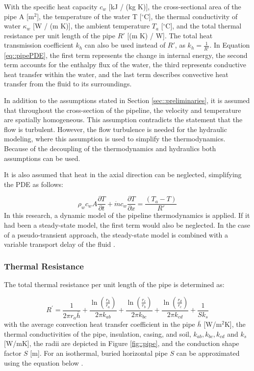 With the specific heat capacity $c_w$ [kJ / (kg K)], the cross-sectional area of the pipe A [m$^2$], the temperature of the water T [$^{\circ}\text{C}$], the thermal conductivity of water $\kappa_w$ [W / (m K)], the ambient temperature $T_a$ [$^{\circ}\text{C}$], and the total thermal resistance per unit length of the pipe $R'$ [(m K) / W]. The total heat transmission coefficient $k_h$ can also be used instead of $R'$, as $k_h = \frac{1}{R'}$. 
In Equation \ref{eq::pipePDE}, the first term represents the change in internal energy, the second term accounts for the enthalpy flux of the water, the third represents conductive heat transfer within the water, and the last term describes convective heat transfer from the fluid to its surroundings.

In addition to the assumptions stated in Section \ref{sec::preliminaries}, it is assumed that throughout the cross-section of the pipeline, the velocity and temperature are spatially homogeneous. This assumption contradicts the statement that the flow is turbulent. However, the flow turbulence is needed for the hydraulic modeling, where this assumption is used to simplify the thermodynamics. Because of the decoupling of the thermodynamics and hydraulics both assumptions can be used. 

It is also assumed that heat in the axial direction can be neglected, simplifying the PDE as follows:

\begin{equation}\label{eq::simpipePDE}
\rho_w c_w A \frac{\partial T}{\partial t} + \dot{m} c_w \frac{\partial T}{\partial x}=\frac{\left(T_a-T\right)}{R'}
\end{equation}
In this research, a dynamic model of the pipeline thermodynamics is applied. If it had been a steady-state model, the first term would also be neglected. In the case of a pseudo-transient approach, the steady-state model is combined with a variable transport delay of the fluid \cite{PipePDE}.

\subsubsection{Thermal Resistance}
The total thermal resistance per unit length of the pipe is determined as: 

\begin{equation}
R^{\prime}=\frac{1}{2 \pi r_a \bar{h}}+\frac{\ln \left(\frac{r_b}{r_a}\right)}{2 \pi k_{a b}}+\frac{\ln \left(\frac{r_c}{r_b}\right)}{2 \pi k_{b c}}+\frac{\ln \left(\frac{r_d}{r_c}\right)}{2 \pi k_{c d}}+\frac{1}{S k_s}
\end{equation}
with the average convection heat transfer coefficient in the pipe $\bar{h}$ [W/m$^2$K], the thermal conductivities of the pipe, insulation, casing, and soil, $k_{ab}, k_{bc}, k_{cd}$ and $k_s$ [W/mK], the radii are depicted in Figure \ref{fig::pipe}, and the conduction shape factor $S$ [m]. For an isothermal, buried horizontal pipe $S$ can be approximated using the equation below \cite{PipePDE}. 

